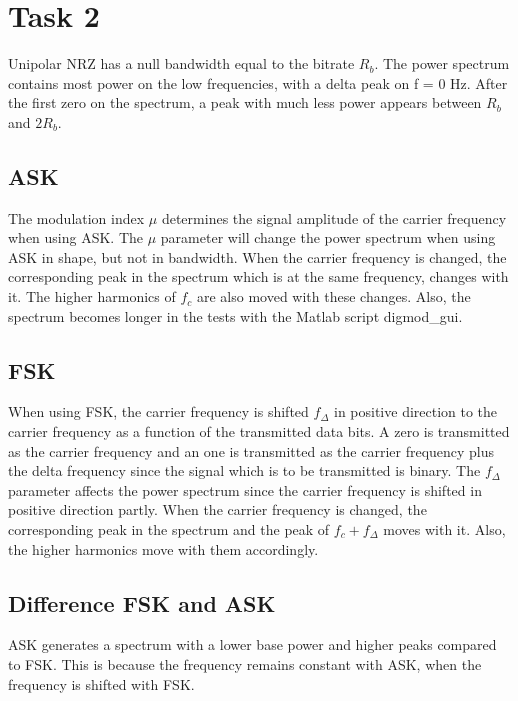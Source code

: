 \documentclass[final]{scrreprt} %
\begin{document}
\chapter{Task 2}
\label{task2}
Unipolar NRZ has a null bandwidth equal to the bitrate $R_b$. The power spectrum contains most power on the low frequencies, with a delta peak on f = 0 Hz. After the first zero on the spectrum, a peak with much less power appears between $R_b$ and $2 R_b$.

\section{ASK}
The modulation index $\mu$ determines the signal amplitude of the carrier frequency when using ASK. The $\mu$ parameter will change the power spectrum when using ASK in shape, but not in bandwidth. When the carrier frequency is changed, the corresponding peak in the spectrum which is at the same frequency, changes with it. The higher harmonics of $f_c$ are also moved with these changes. Also, the spectrum becomes longer in the tests with the Matlab script digmod\_gui.

\section{FSK}
When using FSK, the carrier frequency is shifted $f_{\Delta}$ in positive direction to the carrier frequency as a function of the transmitted data bits. A zero is transmitted as the carrier frequency and an one is transmitted as the carrier frequency plus the delta frequency since the signal which is to be transmitted is binary. The $f_{\Delta}$ parameter affects the power spectrum since the carrier frequency is shifted in positive direction partly. When the carrier frequency is changed, the corresponding peak in the spectrum and the peak of $f_c + f_{\Delta}$ moves with it. Also, the higher harmonics move with them accordingly.

\section{Difference FSK and ASK}
ASK generates a spectrum with a lower base power and higher peaks compared to FSK. This is because the frequency remains constant with ASK, when the frequency is shifted with FSK.
\end{document}
